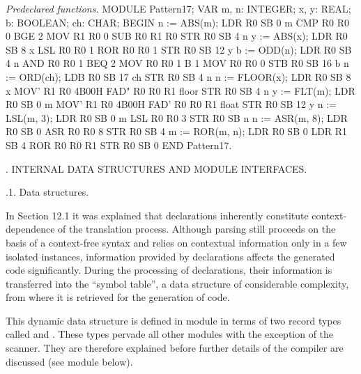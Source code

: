 \noindent {} \emph{Predeclared functions.}
\begintt
MODULE Pattern17;
  VAR m, n: INTEGER;
      x, y: REAL;
      b: BOOLEAN; ch: CHAR;
BEGIN
  n := ABS(m);          LDR R0 SB 0       m
                        CMP R0 R0 0
                        BGE 2
                        MOV R1 R0 0
                        SUB R0 R1 R0
                        STR R0 SB 4       n
  y := ABS(x);          LDR R0 SB 8       x
                        LSL R0 R0 1
                        ROR R0 R0 1
                        STR R0 SB 12      y
  b := ODD(n);          LDR R0 SB 4       n
                        AND R0 R0 1
                        BEQ 2
                        MOV R0 R0 1
                        B 1
                        MOV R0 R0 0
                        STB R0 SB 16      b
  n := ORD(ch);         LDB R0 SB 17      ch
                        STR R0 SB 4       n
  n := FLOOR(x);        LDR R0 SB 8       x
                        MOV' R1 R0 4B00H
                        FAD" R0 R0 R1     floor
                        STR R0 SB 4       n
  y := FLT(m);          LDR R0 SB 0       m
                        MOV' R1 R0 4B00H
                        FAD' R0 R0 R1     float
                        STR R0 SB 12      y
  n := LSL(m, 3);       LDR R0 SB 0       m
                        LSL R0 R0 3
                        STR R0 SB         n
  n := ASR(m, 8);       LDR R0 SB 0
                        ASR R0 R0 8
                        STR R0 SB 4
  m := ROR(m, n);       LDR R0 SB 0
                        LDR R1 SB 4
                        ROR R0 R0 R1
                        STR R0 SB 0
END Pattern17.
\endtt

. INTERNAL DATA STRUCTURES AND MODULE INTERFACES.

.1. Data structures.

In Section 12.1 it was explained that declarations inherently constitute context-dependence of the translation process. Although parsing still proceeds on the basis of a context-free syntax and relies on contextual information only in a few isolated instances, information provided by declarations affects the generated code significantly. During the processing of declarations, their information is transferred into the ``symbol table'', a data structure of considerable complexity, from where it is retrieved for the generation of code.

This dynamic data structure is defined in module  in terms of two record types called  and . These types pervade all other modules with the exception of the scanner. They are therefore explained before further details of the compiler are discussed (see module  below).

